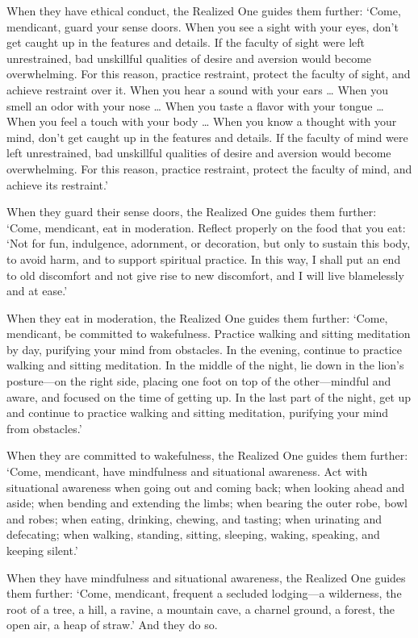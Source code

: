 \documentclass[12pt,openany]{book}%
\begin{document}
When they have ethical conduct, the Realized One guides them further: ‘Come, mendicant, guard your sense doors. When you see a sight with your eyes, don’t get caught up in the features and details. If the faculty of sight were left unrestrained, bad unskillful qualities of desire and aversion would become overwhelming. For this reason, practice restraint, protect the faculty of sight, and achieve restraint over it. When you hear a sound with your ears … When you smell an odor with your nose … When you taste a flavor with your tongue … When you feel a touch with your body … When you know a thought with your mind, don’t get caught up in the features and details. If the faculty of mind were left unrestrained, bad unskillful qualities of desire and aversion would become overwhelming. For this reason, practice restraint, protect the faculty of mind, and achieve its restraint.’ 

When they guard their sense doors, the Realized One guides them further: ‘Come, mendicant, eat in moderation. Reflect properly on the food that you eat: ‘Not for fun, indulgence, adornment, or decoration, but only to sustain this body, to avoid harm, and to support spiritual practice. In this way, I shall put an end to old discomfort and not give rise to new discomfort, and I will live blamelessly and at ease.’ 

When they eat in moderation, the Realized One guides them further: ‘Come, mendicant, be committed to wakefulness. Practice walking and sitting meditation by day, purifying your mind from obstacles. In the evening, continue to practice walking and sitting meditation. In the middle of the night, lie down in the lion’s posture—on the right side, placing one foot on top of the other—mindful and aware, and focused on the time of getting up. In the last part of the night, get up and continue to practice walking and sitting meditation, purifying your mind from obstacles.’ 

When they are committed to wakefulness, the Realized One guides them further: ‘Come, mendicant, have mindfulness and situational awareness. Act with situational awareness when going out and coming back; when looking ahead and aside; when bending and extending the limbs; when bearing the outer robe, bowl and robes; when eating, drinking, chewing, and tasting; when urinating and defecating; when walking, standing, sitting, sleeping, waking, speaking, and keeping silent.’ 

When they have mindfulness and situational awareness, the Realized One guides them further: ‘Come, mendicant, frequent a secluded lodging—a wilderness, the root of a tree, a hill, a ravine, a mountain cave, a charnel ground, a forest, the open air, a heap of straw.’ And they do so. 
\end{document}
